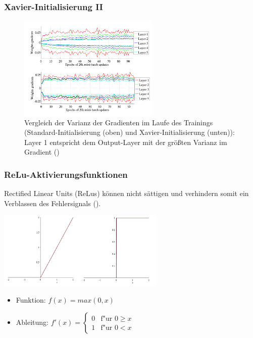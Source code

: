 \documentclass{beamer}
\begin{document}
\begin{frame}
\frametitle{Xavier-Initialisierung II}
\begin{figure}
\centering
\includegraphics[width=0.6\textwidth]{images/4_xavier_init.PNG}
\caption{Vergleich der Varianz der Gradienten im Laufe des Trainings
(Standard-Initialisierung (oben) und Xavier-Initialisierung (unten)): Layer 1
entspricht dem Output-Layer mit der größten Varianz im Gradient (\cite{Glorot2010})}
\end{figure}
\end{frame}

\begin{frame}
\frametitle{ReLu-Aktivierungsfunktionen}
Rectified Linear Units (ReLus) können nicht sättigen und verhindern somit ein Verblassen des Fehlersignals (\cite{Glorot2011}). 
\begin{center}
\includegraphics[width=0.6\textwidth]{images/2_relu}
   \begin{itemize}
   \item Funktion: 
   		$	f(x) =  max(0,x) $
   \item Ableitung: 
   		 $  f'(x) =
   		   \begin{cases}
   		     0 & \text{f"ur } 0 \ge x  \\
   		     1 & \text{f"ur } 0 < x
   		     \end{cases} $
   \end{itemize}
\end{center}
\end{frame}
\end{document}
